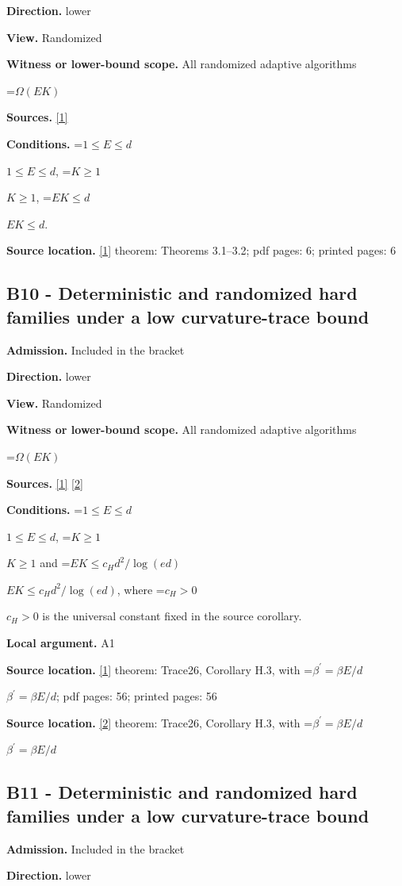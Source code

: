 \documentclass[10pt,a4paper]{article}
\newcommand{\AtlasMath}[1]{\par\begingroup\centering\setbox0=\hbox{$\displaystyle #1$}\ifdim\wd0>1.4\linewidth\typeout{ATLAS WIDE FORMULA: \the\wd0}\fi\ifdim\wd0>\linewidth\resizebox{\linewidth}{!}{\box0}\else\box0\fi\par\endgroup}
\newcommand{\AtlasInlineMath}[1]{\begingroup\setbox0=\hbox{$#1$}\ifdim\wd0>.4\linewidth\endgroup\AtlasMath{#1}\else\endgroup$#1$\fi}
\begin{document}
\textbf{Direction.} lower

\textbf{View.} Randomized

\textbf{Witness or lower-bound scope.} All randomized adaptive algorithms

\AtlasMath{\Omega(EK)}
\textbf{Sources.} \href{https://arxiv.org/pdf/2610.27550v2}{[1]}

\textbf{Conditions.} \AtlasInlineMath{1\le E\le d}, \AtlasInlineMath{K\ge1}, \AtlasInlineMath{EK\le d}.

\textbf{Source location.} \href{https://arxiv.org/pdf/2610.27550v2}{[1]} theorem: Theorems 3.1--3.2; pdf pages: 6; printed pages: 6

\subsection{B10 - Deterministic and randomized hard families under a low curvature-trace bound}
\textbf{Admission.} Included in the bracket

\textbf{Direction.} lower

\textbf{View.} Randomized

\textbf{Witness or lower-bound scope.} All randomized adaptive algorithms

\AtlasMath{\Omega(EK)}
\textbf{Sources.} \href{https://arxiv.org/pdf/2610.27550v2}{[1]} \href{https://arxiv.org/html/2610.19652v1}{[2]}

\textbf{Conditions.} \AtlasInlineMath{1\le E\le d}, \AtlasInlineMath{K\ge1} and \AtlasInlineMath{EK\le c_Hd^2/\log(ed)}, where \AtlasInlineMath{c_H>0} is the universal constant fixed in the source corollary.

\textbf{Local argument.} A1

\textbf{Source location.} \href{https://arxiv.org/pdf/2610.27550v2}{[1]} theorem: Trace26, Corollary H.3, with \AtlasInlineMath{\beta^\prime=\beta E/d}; pdf pages: 56; printed pages: 56

\textbf{Source location.} \href{https://arxiv.org/html/2610.19652v1}{[2]} theorem: Trace26, Corollary H.3, with \AtlasInlineMath{\beta^\prime=\beta E/d}

\subsection{B11 - Deterministic and randomized hard families under a low curvature-trace bound}
\textbf{Admission.} Included in the bracket

\textbf{Direction.} lower
\end{document}
